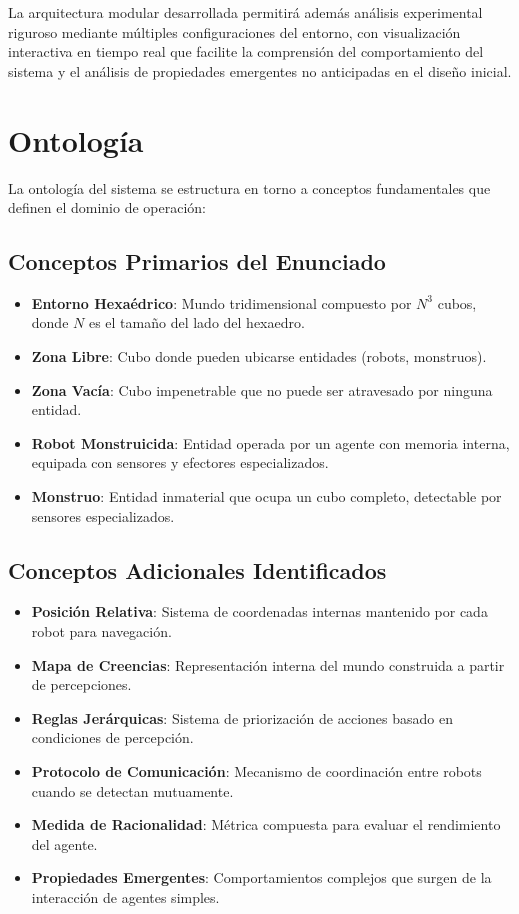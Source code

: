 \documentclass[10pt,twocolumn]{article}
\begin{document}
La arquitectura modular desarrollada permitirá además análisis experimental riguroso mediante múltiples configuraciones del entorno, con visualización interactiva en tiempo real que facilite la comprensión del comportamiento del sistema y el análisis de propiedades emergentes no anticipadas en el diseño inicial.

\section{Ontología}

La ontología del sistema se estructura en torno a conceptos fundamentales que definen el dominio de operación:

\subsection{Conceptos Primarios del Enunciado}

\begin{itemize}
\item \textbf{Entorno Hexaédrico}: Mundo tridimensional compuesto por $N^3$ cubos, donde $N$ es el tamaño del lado del hexaedro.
\item \textbf{Zona Libre}: Cubo donde pueden ubicarse entidades (robots, monstruos).
\item \textbf{Zona Vacía}: Cubo impenetrable que no puede ser atravesado por ninguna entidad.
\item \textbf{Robot Monstruicida}: Entidad operada por un agente con memoria interna, equipada con sensores y efectores especializados.
\item \textbf{Monstruo}: Entidad inmaterial que ocupa un cubo completo, detectable por sensores especializados.
\end{itemize}

\subsection{Conceptos Adicionales Identificados}

\begin{itemize}
\item \textbf{Posición Relativa}: Sistema de coordenadas internas mantenido por cada robot para navegación.
\item \textbf{Mapa de Creencias}: Representación interna del mundo construida a partir de percepciones.
\item \textbf{Reglas Jerárquicas}: Sistema de priorización de acciones basado en condiciones de percepción.
\item \textbf{Protocolo de Comunicación}: Mecanismo de coordinación entre robots cuando se detectan mutuamente.
\item \textbf{Medida de Racionalidad}: Métrica compuesta para evaluar el rendimiento del agente.
\item \textbf{Propiedades Emergentes}: Comportamientos complejos que surgen de la interacción de agentes simples.
\end{itemize}
\end{document}
